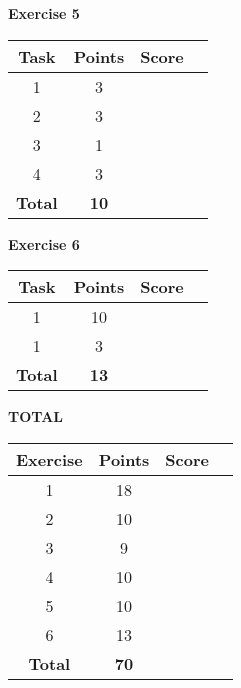 \documentclass [11pt, a4wide, twoside]{article}
\begin{document}
\noindent
\begin{minipage}[t]{120pt}

\vspace{1cm}


\textbf{Exercise 5}
\vspace{5pt}\\
\begin{tabular}{|c|c|c|c|}
\hline
Task & Points & Score \\\hline
1 & 3 & \\\hline
2 & 3 & \\\hline
3 & 1 & \\\hline
4 & 3 & \\\hline
\textbf{Total} & \textbf{10} &\\\hline\hline
\end{tabular}
\end{minipage}
\begin{minipage}[t]{120pt}
\vspace{1cm}

\textbf{Exercise 6}
\vspace{5pt}\\
\begin{tabular}{|c|c|c|c|}
\hline
Task & Points & Score \\\hline
1 & 10 & \\\hline
1 & 3 & \\\hline
\textbf{Total} & \textbf{13} &\\\hline\hline
\end{tabular}
\end{minipage}
\begin{minipage}[t]{120pt}
\vspace{1cm}

\textbf{TOTAL}
\vspace{5pt}\\
\begin{tabular}{|c|c|c|c|}
\hline
Exercise & Points & Score \\\hline
1 & 18 & \\\hline
2 & 10 & \\\hline
3 & 9 & \\\hline
4 & 10 & \\\hline
5 & 10 & \\\hline
6 & 13 & \\\hline
\textbf{Total} & \textbf{70} &\\\hline\hline
\end{tabular}
\end{minipage}
\end{document}
